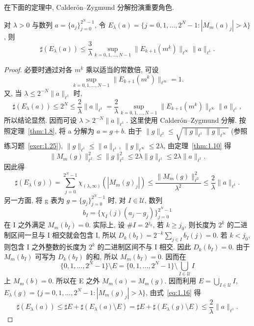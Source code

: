 在下面的定理中, Calderón--Zygmund 分解扮演重要角色.

\begin{theorem}\label{thm:1.11}
对 $\lambda > 0$ 与数列 $a = \{a_{j}\}_{j=0}^{2^{N}-1}$, 令 $E_{\lambda}(a) = \{j = 0, 1, \ldots, 2^{N}-1 : |M_{m}(a)_{j}| > \lambda\}$, 则
\[
\sharp(E_{\lambda}(a)) \leq \frac{3}{\lambda}\sup_{k=0,1,\ldots,N-1}\|E_{k+1}(m^{k})\|_{\ell^{\infty}}\|a\|_{\ell^{1}}.
\]
\end{theorem}

\begin{proof}
必要时通过对各 $m^{k}$ 乘以适当的常数倍, 可设
\[
\sup_{k=0,1,\ldots,N-1}\|E_{k+1}(m^{k})\|_{\ell^{\infty}} = 1.
\]
又, 当 $\lambda \leq 2^{-N}\|a\|_{\ell^{1}}$ 时,
\[
\sharp(E_{\lambda}(a)) \leq 2^{N} \leq \frac{2}{\lambda}\|a\|_{\ell^{1}} = \frac{2}{\lambda}\sup_{k=0,1,\ldots,N-1}\|E_{k+1}(m^{k})\|_{\ell^{\infty}}\|a\|_{\ell^{1}},
\]
所以结论显然. 因而可设 $\lambda > 2^{-N}\|a\|_{\ell^{1}}$. 这里使用 Calderón--Zygmund 分解. 按照定理~\ref{thm:1.8}, 将 a 分解为 $a = g + b$. 由于 $\|g\|_{\ell^{2}} \leq \sqrt{\|g\|_{\ell^{1}}\|g\|_{\ell^{\infty}}}$ (参照练习题~\ref{exer:1.25}), $\|g\|_{\ell^{1}} \leq \|a\|_{\ell^{1}}$, $\|g\|_{\ell^{\infty}} \leq 2\lambda$, 由定理~\ref{thm:1.10} 得
\[
\|M_{m}(g)\|_{\ell^{2}}^{2} \leq \|g\|_{\ell^{2}}^{2} \leq 2\lambda\|g\|_{\ell^{1}} \leq 2\lambda\|a\|_{\ell^{1}}.
\]
因此得
\begin{equation}\tag{1.16}
\sharp(E_{\lambda}(g)) = \sum_{j=0}^{2^{N}-1}\chi_{(\lambda,\infty)}(|M_{m}(g)_{j}|) \leq \frac{\|M_{m}(g)\|_{\ell^{2}}^{2}}{\lambda^{2}} \leq \frac{2}{\lambda}\|a\|_{\ell^{1}}.
\label{eq:1.16}
\end{equation}
另一方面, 将 g 表为 $g = \{g_{j}\}_{j=0}^{2^{N}-1}$ 时, 对 $I \in \mathcal{U}$, 数列
\[
b_{I} = \{\chi_{I}(j)(a_{j} - g_{j})\}_{j=0}^{2^{N}-1}
\]
在 I 之外满足 $M_{m}(b_{I}) = 0$. 实际上, 设 $\#I = 2^{j_{0}}$, 若 $k \geq j_{0}$, 则长度为 $2^{k}$ 的二进制区间一旦与 I 相交就会包含 I, 所以 $D_{k}(b_{I}) = 2^{-k}\sum_{j\in I}b_{I}(j) = 0$. 若 $k < j_{0}$, 则包含 I 之外整数的长度为 $2^{k}$ 的二进制区间不与 I 相交. 因此 $D_{k}(b_{I}) = 0$. 由于 $M_{m}(b_{I})$ 可写为 $D_{k}(b_{I})$ 的和, 所以 $M_{m}(b_{I}) = 0$. 因而在
\[
\{0, 1, \ldots, 2^{N}-1\}\setminus E = \{0, 1, \ldots, 2^{N}-1\}\setminus\bigcup_{I\in\mathcal{U}}I
\]
上 $M_{m}(b) = 0$. 所以在 E 之外 $M_{m}(a) = M_{m}(g)$. 因而利用 $E = \bigcup_{I\in\mathcal{U}}I$, $E_{\lambda}(g) = \{j = 0, 1, \ldots, 2^{N}-1 : |M_{m}(g)_{j}| > \lambda\}$, 由式~\eqref{eq:1.16} 得
\[
\sharp(E_{\lambda}(a)) \leq \sharp E + \sharp(E_{\lambda}(a)\setminus E) = \sharp E + \sharp(E_{\lambda}(g)\setminus E) \leq \frac{2}{\lambda}\|a\|_{\ell^{1}}.
\]
\end{proof}

